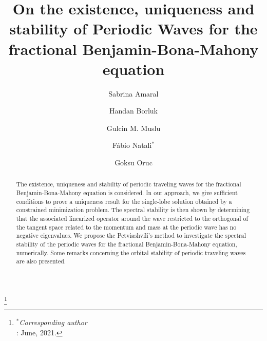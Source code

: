 \documentclass[12pt,reqno]{amsart}
\newcommand{\2}{L^2_{per}(0, T)}
\numberwithin{equation}{section}
\numberwithin{figure}{section}
\begin{document}


\title[ Periodic waves for the fractional BBM]{On the existence, uniqueness and stability of Periodic Waves for the fractional Benjamin-Bona-Mahony equation}


\thanks{$^*${\it Corresponding author}\\
	: June, 2021.}



\author{Sabrina Amaral}

\address[S. Amaral]{Department of Mathematics, State University of
	Maring\'a, Maring\'a, PR, Brazil. }

\author{Handan Borluk}

\address[H. Borluk]{Ozyegin University, Department of Natural and Mathematical Sciences, Cekmekoy, Istanbul, Turkey. }

\author{Gulcin M. Muslu}

\address[G. M. Muslu]{Istanbul Technical University, Department of Mathematics, Maslak,
	Istanbul,  Turkey.}


\author{F\'abio Natali$^*$}

\address[F. Natali]{Department of Mathematics, State University of
	Maring\'a, Maring\'a, PR, Brazil. }


\author{Goksu Oruc}

\address[G. Oruc]{Istanbul Technical University, Department of Mathematics, Maslak,
         Istanbul,  Turkey.}

\maketitle


\begin{abstract}
The  existence, uniqueness and stability of periodic traveling waves for the fractional Benjamin-Bona-Mahony equation is considered. In our approach, we give sufficient conditions to prove a uniqueness result for the single-lobe solution obtained by a constrained minimization problem. The spectral stability is then shown by determining that the associated linearized operator around the wave restricted to the orthogonal of the tangent space related to the momentum and mass at the periodic wave has no negative eigenvalues. We propose the Petviashvili's method to investigate the spectral stability of the  periodic waves for the fractional Benjamin-Bona-Mahony equation, numerically. Some remarks concerning the orbital stability of periodic traveling waves are also presented.
\end{abstract}
\end{document}
